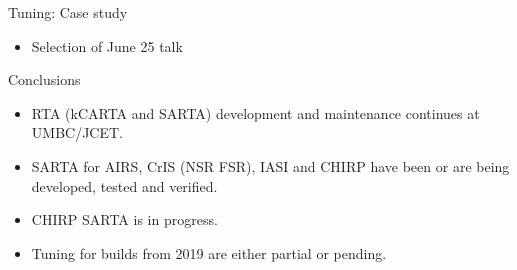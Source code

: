 \documentclass[10pt,t]{beamer}
\begin{document}
\begin{frame}{Tuning: Case study}

  \begin{block}{}
  \end{block}

  \begin{itemize}
  \item Selection of June 25 talk
  \end{itemize}

\end{frame}
\begin{frame}{Conclusions}

  \begin{block}{}
  \end{block}

  \begin{itemize}
  \item RTA (kCARTA and SARTA) development and maintenance continues at UMBC/JCET.
  \item SARTA for AIRS, CrIS (NSR FSR), IASI and CHIRP have been or are being developed, tested
    and verified.
  \item CHIRP SARTA is in progress.
  \item Tuning for builds from 2019 are either partial or pending.
    
  \end{itemize}

\end{frame}
\end{document}
